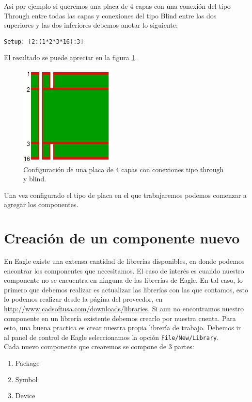 \documentclass[11pt,letterpaper,spanish]{article}
\begin{document}
Asi por ejemplo si queremos una placa de 4 capas con una conexión del tipo Through entre todas las capas y conexiones del tipo Blind entre las dos superiores y las dos inferiores debemos anotar lo siguiente: 

\begin{verbatim}
Setup: [2:(1*2*3*16):3]
\end{verbatim}

El resultado se puede apreciar en la figura \ref{setup2}.

\begin{figure}[!h]
\begin{center}
\includegraphics[scale=0.5]{figuras/2.JPG}
\end{center}
\caption{\label{setup2} Configuración de una placa de 4 capas con conexiones tipo through y blind.}
\end{figure}

Una vez configurado el tipo de placa en el que trabajaremos podemos comenzar a agregar los componentes.

\section{Creación de un componente nuevo}
En Eagle existe una extensa cantidad de librerías disponibles, en donde podemos encontrar los componentes que necesitamos. El caso de interés es cuando nuestro componente no se encuentra en ninguna de las librerías de Eagle. En tal caso, lo primero que debemos realizar es actualizar las librerías con las que contamos, esto lo podemos realizar desde la página del proveedor, en \url{http://www.cadsoftusa.com/downloads/libraries}. 
Si aun no encontramos nuestro componente en un librería existente debemos crearlo por nuestra cuenta. Para esto, una buena practica es crear nuestra propia librería de trabajo.
 Debemos ir al panel de control de Eagle seleccionamos la opción \verb+File/New/Library+.\\ Cada nuevo componente que crearemos se compone de 3 partes:
\begin{enumerate}
\item Package
\item Symbol
\item Device
\end{enumerate}
\end{document}

